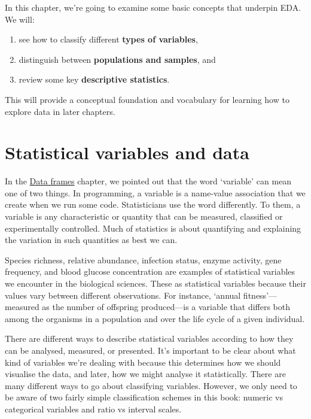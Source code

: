 \documentclass[
]{book}
\providecommand{\tightlist}{%
  \setlength{\itemsep}{0pt}\setlength{\parskip}{0pt}}
\begin{document}
In this chapter, we're going to examine some basic concepts that underpin EDA. We will:

\begin{enumerate}
\def\labelenumi{\arabic{enumi}.}
\tightlist
\item
  see how to classify different \textbf{types of variables},
\item
  distinguish between \textbf{populations and samples}, and
\item
  review some key \textbf{descriptive statistics}.
\end{enumerate}

This will provide a conceptual foundation and vocabulary for learning how to explore data in later chapters.

\hypertarget{variables}{%
\section{Statistical variables and data}\label{variables}}

In the \protect\hyperlink{chapter-data-frames}{Data frames} chapter, we pointed out that the word `variable' can mean one of two things. In programming, a variable is a name-value association that we create when we run some code. Statisticians use the word differently. To them, a variable is any characteristic or quantity that can be measured, classified or experimentally controlled. Much of statistics is about quantifying and explaining the variation in such quantities as best we can.

Species richness, relative abundance, infection status, enzyme activity, gene frequency, and blood glucose concentration are examples of statistical variables we encounter in the biological sciences. These as statistical variables because their values vary between different observations. For instance, `annual fitness'---measured as the number of offspring produced---is a variable that differs both among the organisms in a population and over the life cycle of a given individual.

There are different ways to describe statistical variables according to how they can be analysed, measured, or presented. It's important to be clear about what kind of variables we're dealing with because this determines how we should visualise the data, and later, how we might analyse it statistically. There are many different ways to go about classifying variables. However, we only need to be aware of two fairly simple classification schemes in this book: numeric vs categorical variables and ratio vs interval scales.
\end{document}
